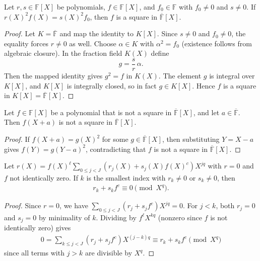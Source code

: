 \begin{lemma}\label{lem:stepanov-square-from-eq} \leanok {}
  Let $r, s \in \mathbb{F}[X]$ be polynomials, $f \in \mathbb{F}[X]$, and $f_0 \in \mathbb{F}$ with $f_0 \neq 0$ and $s \neq 0$. If $r(X)^2 f(X) = s(X)^2 f_0$, then $f$ is a square in $\overline{\mathbb{F}}[X]$.
\end{lemma}
\begin{proof} \leanok
  Let $K = \overline{\mathbb{F}}$ and map the identity to $K[X]$.
  Since $s \neq 0$ and $f_0 \neq 0$, the equality forces $r \neq 0$ as well.
  Choose $\alpha \in K$ with $\alpha^2 = f_0$ (existence follows from algebraic closure).
  In the fraction field $K(X)$ define
  \[
    g = \frac{s}{r}\,\alpha.
  \]
  Then the mapped identity gives $g^2 = f$ in $K(X)$.
  The element $g$ is integral over $K[X]$, and $K[X]$ is integrally closed, so in fact
  $g \in K[X]$. Hence $f$ is a square in $K[X] = \overline{\mathbb{F}}[X]$.
\end{proof}

\begin{lemma}\label{lem:stepanov-nonzero-shift-preserves} \leanok {}
  Let $f \in \mathbb{F}[X]$ be a polynomial that is not a square in $\overline{\mathbb{F}}[X]$, and let $a \in \overline{\mathbb{F}}$. Then $f(X+a)$ is not a square in $\overline{\mathbb{F}}[X]$.
\end{lemma}
\begin{proof} \leanok
  If $f(X+a) = g(X)^2$ for some $g \in \overline{\mathbb{F}}[X]$, then substituting $Y = X-a$ gives $f(Y) = g(Y-a)^2$, contradicting that $f$ is not a square in $\overline{\mathbb{F}}[X]$.
\end{proof}

\begin{lemma}\label{lem:stepanov-nonzero-minimal-congruence} \leanok {}
  Let $r(X) = f(X)^\ell \sum_{0 \leq j < J} (r_j(X) + s_j(X) f(X)^c) X^{jq}$ with $r = 0$ and $f$ not identically zero. If $k$ is the smallest index with $r_k \neq 0$ or $s_k \neq 0$, then
  \begin{align*}
    r_k + s_k f^c \equiv 0 \pmod{X^q}.
  \end{align*}
\end{lemma}
\begin{proof} \leanok
  Since $r = 0$, we have $\sum_{0 \leq j < J} (r_j + s_j f^c) X^{jq} = 0$. For $j < k$, both $r_j = 0$ and $s_j = 0$ by minimality of $k$. Dividing by $f^\ell X^{kq}$ (nonzero since $f$ is not identically zero) gives
  \begin{align*}
    0 = \sum_{k \leq j < J} (r_j + s_j f^c) X^{(j-k)q} \equiv r_k + s_k f^c \pmod{X^q}
  \end{align*}
  since all terms with $j > k$ are divisible by $X^q$.
\end{proof}

